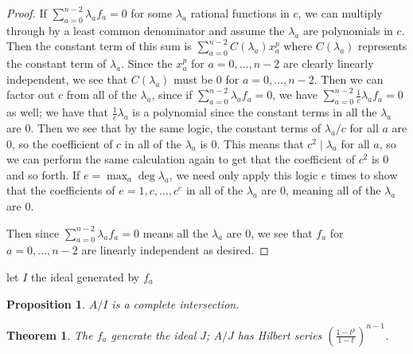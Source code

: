 \documentclass{article}
\numberwithin{equation}{section}
\newtheorem{theorem}[equation]{Theorem}
\newtheorem{proposition}[equation]{Proposition}
\begin{document}
\begin{proof}
If $\sum_{a=0}^{n-2} \lambda_af_a=0$ for some $\lambda_a$ rational functions in $c$, we can multiply through by a least common denominator and assume the $\lambda_a$ are polynomials in $c$. Then the constant term of this sum is $\sum_{a=0}^{n-2} C(\lambda_a)x_a^p$ where $C(\lambda_a)$ represents the constant term of $\lambda_a$. Since the $x_a^p$ for $a=0,\dots,n-2$ are clearly linearly independent, we see that $C(\lambda_a)$ must be $0$ for $a=0,\dots,n-2$. Then we can factor out $c$ from all of the $\lambda_a$, since if $\sum_{a=0}^{n-2} \lambda_af_a=0$, we have $\sum_{a=0}^{n-2}\frac{1}{c}\lambda_af_a=0$ as well; we have that $\frac{1}{c}\lambda_a$ is a polynomial since the constant terms in all the $\lambda_a$ are $0$. Then we see that by the same logic, the constant terms of $\lambda_a/c$ for all $a$ are 0, so the coefficient of $c$ in all of the $\lambda_a$ is $0$. This means that $c^2 \mid \lambda_a$ for all $a$, so we can perform the same calculation again to get that the coefficient of $c^2$ is $0$ and so forth. If $e=\max_a\deg \lambda_a$, we need only apply this logic $e$ times to show that the coefficients of $e=1,c,\dots,c^e$ in all of the $\lambda_a$ are $0$, meaning all of the $\lambda_a$ are $0$. 

Then since $\sum_{a=0}^{n-2} \lambda_af_a=0$ means all the $\lambda_a$ are $0$, we see that $f_a$ for $a=0,\dots,n-2$ are linearly independent as desired. 

\end{proof}

let $I$ the ideal generated by $f_a$

\begin{proposition} $A/I$ is a complete intersection. 
\end{proposition}

\begin{theorem} The $f_a$ generate the ideal $J$; $A/J$ has Hilbert series $\left(\frac{1-t^p}{1-t}\right)^{n-1}$. 
\end{theorem}
\end{document}
